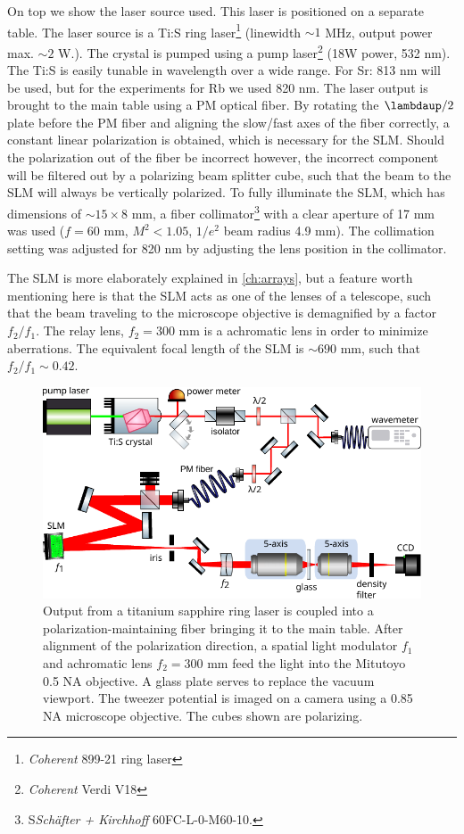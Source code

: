 On top we show the laser source used.
This laser is positioned on a separate table. 
The laser source is a \ac{Ti:S} ring laser\footnote{\textit{Coherent} 899-21 ring laser} (linewidth $\sim 1$ MHz, output power max. $\sim 2$ W.). 
The crystal is pumped using a pump laser\footnote{\textit{Coherent} Verdi V18} (18W power, 532 nm).
The \ac{Ti:S} is easily tunable in wavelength over a wide range. For Sr: 813 nm will be used, but for the experiments for Rb we used 820 nm. 
The laser output is brought to the main table using a \ac{PM} optical fiber.
By rotating the $\lambdaup/2$ plate before the PM fiber and aligning the slow/fast axes of the fiber correctly, a constant linear polarization is obtained, which is necessary for the \ac{SLM}.
Should the polarization out of the fiber be incorrect however, the incorrect component will be filtered out by a polarizing beam splitter cube, such that the beam to the SLM will always be vertically polarized.
To fully illuminate the SLM, which has dimensions of $\sim 15 \times 8$ mm, a fiber collimator\footnote{S\textit{Schäfter + Kirchhoff} 60FC-L-0-M60-10.} with a clear aperture of 17 mm was used ($f=60$ mm, $M^2 < 1.05$, $1/e^2$ beam radius 4.9 mm).
The collimation setting was adjusted for 820 nm by adjusting the lens position in the collimator.

The SLM is more elaborately explained in \cref{ch:arrays}, but a feature worth mentioning here is that the SLM acts as one of the lenses of a telescope, such that the beam traveling to the microscope objective is demagnified by a factor $f_2/f_1$.
The relay lens, $f_2=300$ mm is a achromatic lens in order to minimize aberrations.
The equivalent focal length of the SLM is $\sim 690$ mm, such that $f_2/f_1 \sim 0.42$.

\begin{figure}
    \centering
    \includegraphics[width=0.95\linewidth]{figures/TiSandSLM.pdf}
    \caption{Output from a titanium sapphire ring laser is coupled into a polarization-maintaining fiber bringing it to the main table. 
    After alignment of the polarization direction, a spatial light modulator $f_1$ and achromatic lens $f_2 = 300$ mm feed the light into the Mitutoyo 0.5 NA objective.
    A glass plate serves to replace the vacuum viewport.
    The tweezer potential is imaged on a camera using a 0.85 NA microscope objective.
    The cubes shown are polarizing.}
    \label{fig:TiSandSLMsetup}
\end{figure}

